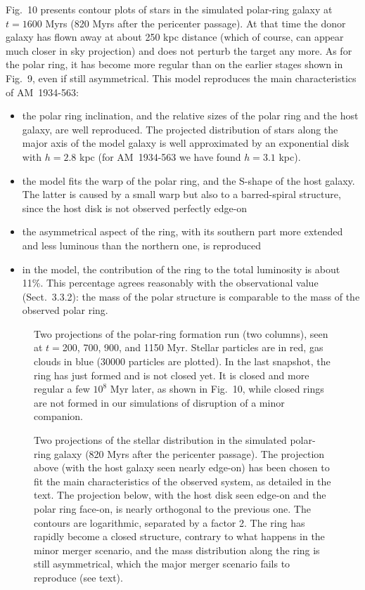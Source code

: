 \documentclass[]{aa}
\begin{document}
Fig.~10 presents contour plots of stars in the simulated polar-ring galaxy 
at $t=1600$ Myrs (820 Myrs after the pericenter passage). At that time 
the donor galaxy has flown away at about 250 kpc distance (which of 
course, can appear much closer in sky projection) and does not perturb 
the target any more. As for the polar ring, it has become more regular 
than on the earlier stages shown in Fig.~9, even if still asymmetrical. 
This model reproduces the main characteristics of AM~1934-563: 
\begin{itemize}
\item the polar ring inclination, and the relative sizes of the polar 
ring and the host galaxy, are well reproduced. The projected distribution 
of stars along the major axis of the model galaxy is well approximated 
by an exponential disk with $h=2.8$ kpc (for AM~1934-563 we have found 
$h=3.1$ kpc).
\item the model fits the warp of the polar ring, and the S-shape of the 
host galaxy. The latter is caused by a small warp but also to a 
barred-spiral structure, since the host disk is not observed perfectly 
edge-on
\item the asymmetrical aspect of the ring, with its southern part more 
extended and less luminous than the northern one, is reproduced
\item in the model, the contribution of the ring to the total luminosity 
is about 11\%. This percentage agrees reasonably with the observational 
value (Sect.~3.3.2): the mass of the polar structure is comparable to 
the mass of the observed polar ring.
\end{itemize}

\begin{figure}
\centerline{}
\caption{Two projections of the polar-ring formation run (two columns), 
seen at $t=$200, 700, 900, and 1150 Myr. Stellar particles are in red, 
gas clouds in blue (30000 particles are plotted). In the last snapshot, 
the ring has just formed and is not closed yet. It is closed and more 
regular a few $10^8$ Myr later, as shown in Fig.~10, while closed rings 
are not formed in our simulations of disruption of a minor companion.}
\end{figure}

\begin{figure}
\centerline{}
\caption{Two projections of the stellar distribution in the simulated 
polar-ring galaxy (820 Myrs after the pericenter passage). The projection 
above (with the host galaxy seen nearly edge-on) has been chosen to 
fit the main characteristics of the observed system, as detailed in the 
text. The projection below, with the host disk seen edge-on and the polar 
ring face-on, is nearly orthogonal to the previous one. The contours 
are logarithmic, separated by a factor 2. The ring has rapidly become a
closed structure, contrary to what happens in the minor merger scenario,
and the mass distribution along the ring is still asymmetrical, which the major 
merger scenario fails to reproduce (see text).} 
\end{figure}
\end{document}
